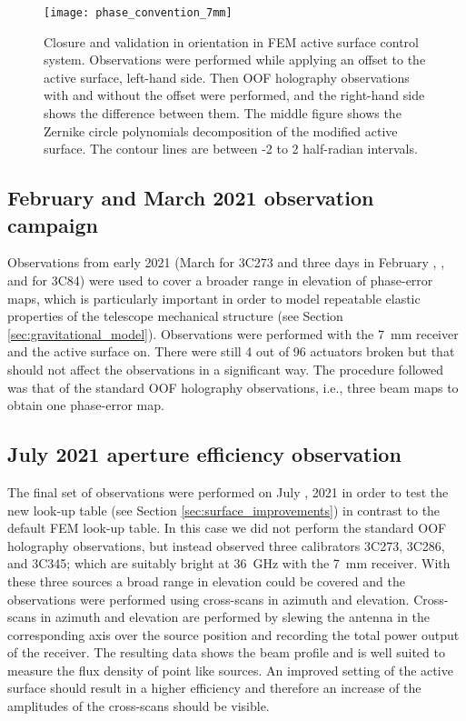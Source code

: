 \documentclass[
    ]
    {aa}
\begin{document}
    \begin{figure*}[h]
        \centering
        \texttt{[image: phase\_convention\_7mm]}
        \caption{Closure and validation in orientation in FEM active surface control system. Observations were performed while applying an offset to the active surface, left-hand side. Then OOF holography observations with and without the offset were performed, and the right-hand side shows the difference between them. The middle figure shows the Zernike circle polynomials decomposition of the modified active surface. The contour lines are between -2 to 2 half-radian intervals.}
        \label{fig:phase_convention_7mm}
    \end{figure*}

    \subsection{February and March 2021 observation campaign} \label{sec:ObsFebMar2021}

    Observations from early 2021 (March  for 3C273 and three days in February , , and  for 3C84) were used to cover a broader range in elevation of phase-error maps, which is particularly important in order to model repeatable elastic properties of the telescope mechanical structure (see Section \ref{sec:gravitational_model}). Observations were performed with the \SI{7}{\mm} receiver and the active surface on. There were still \num{4} out of \num{96} actuators broken but that should not affect the observations in a significant way. The procedure followed was that of the standard OOF holography observations, i.e., three beam maps to obtain one phase-error map.

    \subsection{July 2021 aperture efficiency observation}
    \label{sec:ObsJuly2021}
    The final set of observations were performed on July , 2021 in order to test the new look-up table (see Section \ref{sec:surface_improvements}) in contrast to the default FEM look-up table. In this case we did not perform the standard OOF holography observations, but instead observed three calibrators 3C273, 3C286, and 3C345; which are suitably bright at \SI{36}{\giga\hertz} with the \SI{7}{\mm} receiver. With these three sources a broad range in elevation could be covered and the observations were performed using cross-scans in azimuth and elevation. Cross-scans in azimuth and elevation are performed by slewing the antenna in the corresponding axis over the source position and recording the total power output of the receiver. The resulting data shows the beam profile and is well suited to measure the flux density of point like sources. An improved setting of the active surface should result in a higher efficiency and therefore an increase of the amplitudes of the cross-scans should be visible. 
\end{document}
